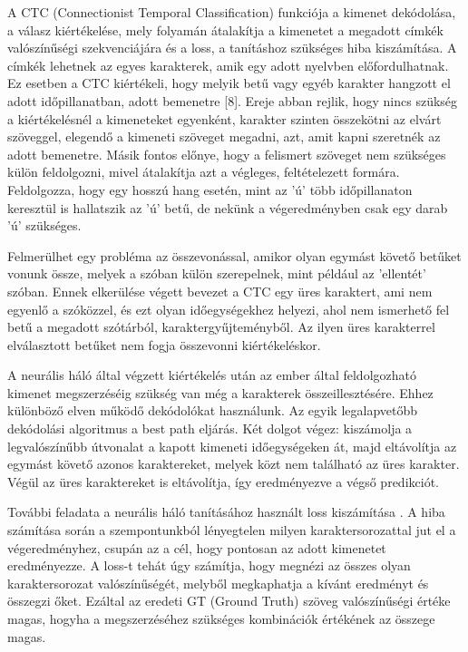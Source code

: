 A CTC (Connectionist Temporal Classification) \cite{ctc} funkciója a kimenet dekódolása, a válasz kiértékelése, mely folyamán átalakítja a kimenetet a megadott címkék valószínűségi szekvenciájára és a loss, a tanításhoz szükséges hiba kiszámítása. A címkék lehetnek az egyes karakterek, amik egy adott nyelvben előfordulhatnak. Ez esetben a CTC kiértékeli, hogy melyik betű vagy egyéb karakter hangzott el adott időpillanatban, adott bemenetre [8]. Ereje abban rejlik, hogy nincs szükség a kiértékelésnél a kimeneteket egyenként, karakter szinten összekötni az elvárt szöveggel, elegendő a kimeneti szöveget megadni, azt, amit kapni szeretnék az adott bemenetre. Másik fontos előnye, hogy a felismert szöveget nem szükséges külön feldolgozni, mivel átalakítja azt a végleges, feltételezett formára. Feldolgozza, hogy egy hosszú hang esetén, mint az ’ú’ több időpillanaton keresztül is hallatszik az ’ú’ betű, de nekünk a végeredményben csak egy darab ’ú’ szükséges.

Felmerülhet egy probléma az összevonással, amikor olyan egymást követő betűket vonunk össze, melyek a szóban külön szerepelnek, mint például az ’ellentét’ szóban. Ennek elkerülése végett bevezet a CTC egy üres karaktert, ami nem egyenlő a szóközzel, és ezt olyan időegységekhez helyezi, ahol nem ismerhető fel betű a megadott szótárból, karaktergyűjteményből. Az ilyen üres karakterrel elválasztott betűket nem fogja összevonni kiértékeléskor.

A neurális háló által végzett kiértékelés után az ember által feldolgozható kimenet megszerzéséig szükség van még a karakterek összeillesztésére. Ehhez különböző elven működő dekódolókat használunk. Az egyik legalapvetőbb dekódolási algoritmus a best path eljárás. Két dolgot végez: kiszámolja a legvalószínűbb útvonalat a kapott kimeneti időegységeken át, majd eltávolítja az egymást követő azonos karaktereket, melyek közt nem található az üres karakter. Végül az üres karaktereket is eltávolítja, így eredményezve a végső predikciót.

További feladata a neurális háló tanításához használt loss kiszámítása \cite{ctc_sid}. A hiba számítása során a szempontunkból lényegtelen milyen karaktersorozattal jut el a végeredményhez, csupán az a cél, hogy pontosan az adott kimenetet eredményezze. A loss-t tehát úgy számítja, hogy megnézi az összes olyan karaktersorozat valószínűségét, melyből megkaphatja a kívánt eredményt és összegzi őket. Ezáltal az eredeti GT (Ground Truth) szöveg valószínűségi értéke magas, hogyha a megszerzéséhez szükséges kombinációk értékének az összege magas.

